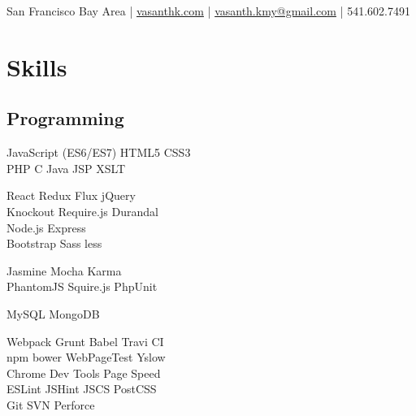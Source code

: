 \documentclass[]{my-resume-openfont}
\begin{document}
%
%

{ San Francisco Bay Area 
| \href{http://www.vasanthk.com}{vasanthk.com} 
| \href{mailto:vasanth.kmy@gmail.com}{vasanth.kmy@gmail.com} 
| 541.602.7491 \\
}

%
%

\begin{minipage}[t]{0.33\textwidth} 


\section{Skills}
\subsection{Programming}
JavaScript (ES6/ES7) \textbullet{} HTML5 \textbullet{} CSS3 \\
PHP \textbullet{} C \textbullet{} Java \textbullet{} JSP \textbullet{} XSLT \\
\sectionsep

React \textbullet{} Redux \textbullet{} Flux \textbullet{} jQuery \\ 
Knockout \textbullet{} Require.js \textbullet{} Durandal \\
Node.js \textbullet{} Express \\
Bootstrap \textbullet{} Sass \textbullet{} less \\
\sectionsep

Jasmine \textbullet{} Mocha \textbullet{} Karma \\
PhantomJS \textbullet{} Squire.js \textbullet{} PhpUnit
\sectionsep

MySQL \textbullet{} MongoDB \\
\sectionsep

Webpack \textbullet{} Grunt \textbullet{} Babel \textbullet{} Travi CI \\ 
npm \textbullet{} bower \textbullet{} WebPageTest \textbullet{} Yslow \\
Chrome Dev Tools \textbullet{} Page Speed \\
ESLint \textbullet{} JSHint \textbullet{} JSCS \textbullet{} PostCSS \\
Git \textbullet{} SVN \textbullet{} Perforce
\sectionsep


\end{minipage}
\end{document}
